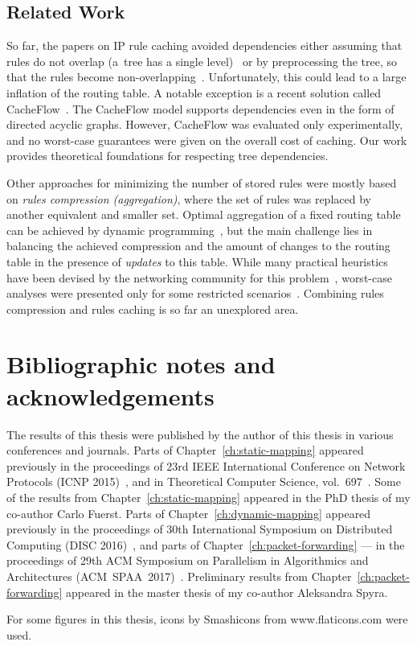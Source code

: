 \subsection{Related Work}

So far, the papers on IP rule caching avoided dependencies either assuming
that rules do not overlap (a~tree has a single level)~\cite{route-caching-flat} 
or by preprocessing the tree, so that the rules become
non-overlapping~\cite{prefix-caching,fib-caching-non-overlapping}.
Unfortunately, this could lead to a large inflation of the routing table. A
notable exception is a recent solution called CacheFlow~\cite{cacheflow}. The
CacheFlow model supports dependencies even in the form of directed acyclic
graphs. However, CacheFlow was evaluated only experimentally, and no
worst-case guarantees were given on the overall cost of caching. Our work
provides theoretical foundations for respecting tree dependencies.


Other approaches for minimizing the number of stored rules were mostly based
on \emph{rules compression (aggregation)}, where the set of rules was replaced
by another equivalent and smaller set. Optimal aggregation of a fixed routing
table can be achieved by dynamic
programming~\cite{ortc,fib-compression-two-dimensional}, but the main
challenge lies in balancing the achieved compression and the amount of changes
to the routing table in the presence of \emph{updates} to this table. While
many practical heuristics have been devised by the networking community for
this problem~\cite{mms,fib-compression-fifa,fib-compression-globecom10,fib-compression-infocom13,fib-sigcomm,fib-compression-smalta,fib-compression-infocom10},
worst-case analyses were presented only for some restricted
scenarios~\cite{fib-icdcs,fib-sirocco}. Combining rules compression and rules
caching is so far an unexplored area.



\section{Bibliographic notes and acknowledgements}

The results of this thesis were published by the author of this thesis in various conferences and journals.
Parts of Chapter~\ref{ch:static-mapping} appeared previously in the proceedings of 23rd IEEE International Conference on Network Protocols (ICNP 2015)~\cite{my-icnp},
and in Theoretical Computer Science, vol.~697~\cite{my-tcs}.
Some of the results from Chapter~\ref{ch:static-mapping} appeared in the PhD thesis of my co-author Carlo Fuerst.
Parts of Chapter~\ref{ch:dynamic-mapping} appeared previously in the proceedings of 30th International Symposium on Distributed Computing (DISC 2016)~\cite{my-disc}, and parts of Chapter~\ref{ch:packet-forwarding} --- in the proceedings of 29th ACM Symposium on Parallelism in Algorithmics and Architectures (ACM~SPAA~2017)~\cite{my-spaa}.
Preliminary results from Chapter~\ref{ch:packet-forwarding} appeared in the master thesis of my co-author Aleksandra Spyra.

For some figures in this thesis, icons by Smashicons from www.flaticons.com were used.